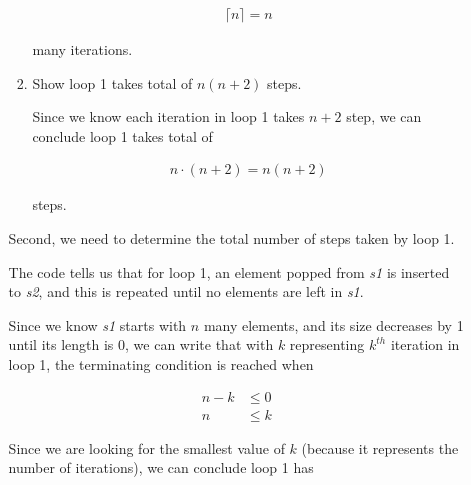 \documentclass[12pt]{article}
\begin{document}
\begin{enumerate}[a.]
\begin{mdframed}
\begin{enumerate}[1.]
\begin{enumerate}[1.]
\begin{mdframed}
                \begin{align}
                    \lceil n \rceil = n
                \end{align}

                many iterations.
                \end{mdframed}

                \item Show loop 1 takes total of $n(n+2)$ steps.

                \begin{mdframed}
                Since we know each iteration in loop 1 takes $n+2$ step, we can conclude
                loop 1 takes total of

                \begin{align}
                    n \cdot (n+2) = n(n+2)
                \end{align}

                steps.
                \end{mdframed}
            \end{enumerate}

            \bigskip

            \begin{mdframed}
            Second, we need to determine the total number of steps taken by loop 1.

            \bigskip

            The code tells us that for loop 1, an element popped from \textit{s1} is inserted to \textit{s2},
            and this is repeated until no elements are left in \textit{s1}.

            \bigskip

            Since we know \textit{s1} starts with $n$ many elements, and its size decreases
            by 1 until its length is 0, we can write that with $k$ representing
            $k^{th}$ iteration in loop 1, the terminating condition is reached when

            \begin{align}
                n - k &\leq 0\\
                n &\leq k
            \end{align}

            \bigskip

            Since we are looking for the smallest value of $k$ (because it represents
            the number of iterations), we can conclude loop 1 has


\end{mdframed}
\end{enumerate}
\end{mdframed}
\end{enumerate}
\end{document}
